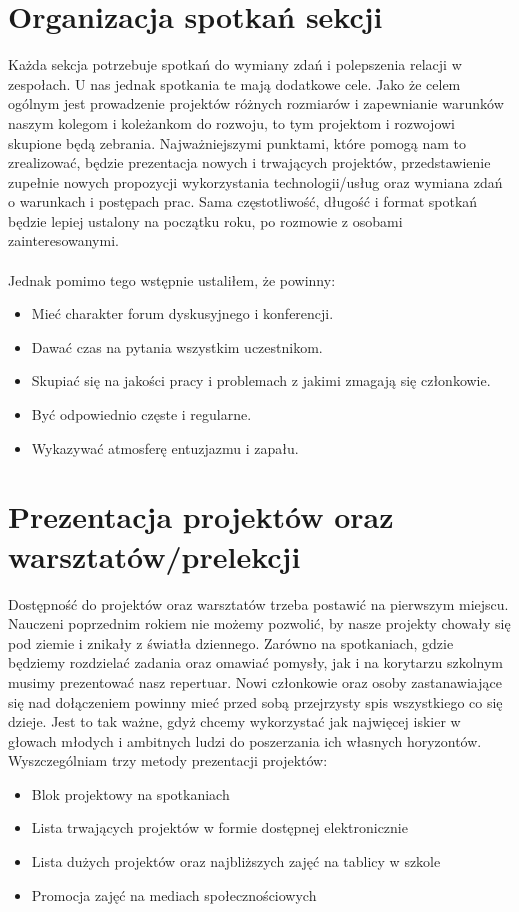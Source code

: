 \documentclass[9pt,a4paper]{report}
\begin{document}
\section{Organizacja spotkań sekcji}
Każda sekcja potrzebuje spotkań do wymiany zdań i polepszenia relacji w zespołach. U nas jednak spotkania te mają dodatkowe cele. Jako że celem ogólnym jest prowadzenie projektów różnych rozmiarów i zapewnianie warunków naszym kolegom i koleżankom do rozwoju, to tym projektom i rozwojowi skupione będą zebrania. Najważniejszymi punktami, które pomogą nam to zrealizować, będzie prezentacja nowych i trwających projektów, przedstawienie zupełnie nowych propozycji wykorzystania technologii/usług oraz wymiana zdań o warunkach i postępach prac. Sama częstotliwość, długość i format spotkań będzie lepiej ustalony na początku roku, po rozmowie z osobami zainteresowanymi.\\\\
Jednak pomimo tego wstępnie ustaliłem, że powinny:
\begin{itemize}
\item Mieć charakter forum dyskusyjnego i konferencji.
\item Dawać czas na pytania wszystkim uczestnikom.
\item Skupiać się na jakości pracy i problemach z jakimi zmagają się członkowie.
\item Być odpowiednio częste i regularne.
\item Wykazywać atmosferę entuzjazmu i zapału.
\end{itemize}

\section{Prezentacja projektów oraz warsztatów/prelekcji}

Dostępność do projektów oraz warsztatów trzeba postawić na pierwszym miejscu. Nauczeni poprzednim rokiem nie możemy pozwolić, by nasze projekty chowały się pod ziemie i znikały z światła dziennego. Zarówno na spotkaniach, gdzie będziemy rozdzielać zadania oraz omawiać pomysły, jak i na korytarzu szkolnym musimy prezentować nasz repertuar. Nowi członkowie oraz osoby zastanawiające się nad dołączeniem powinny mieć przed sobą przejrzysty spis wszystkiego co się dzieje. Jest to tak ważne, gdyż chcemy wykorzystać jak najwięcej iskier w głowach młodych i ambitnych ludzi do poszerzania ich własnych horyzontów.\\
Wyszczególniam trzy metody prezentacji projektów:\\
\begin{itemize}
\item Blok projektowy na spotkaniach
\item Lista trwających projektów w formie dostępnej elektronicznie
\item Lista dużych projektów oraz najbliższych zajęć na tablicy w szkole
\item Promocja zajęć na mediach społecznościowych
\end{itemize}
\end{document}
